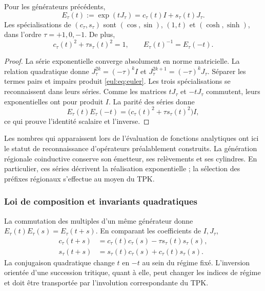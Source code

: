 \begin{teorema}
\label{eul:teo:euler}
Pour les générateurs précédents,
\begin{equation}
 E_\tau(t):=\exp(tJ_\tau)
 =c_\tau(t)I+s_\tau(t)J_\tau.
\label{eul:eq:euler}
\end{equation}
Les spécialisations de \((c_\tau,s_\tau)\) sont
\((\cos,\sin)\), \((1,t)\) et \((\cosh,\sinh)\), dans l’ordre
\(\tau=+1,0,-1\). De plus,
\[
 c_\tau(t)^2+\tau s_\tau(t)^2=1,
 \qquad E_\tau(t)^{-1}=E_\tau(-t).
\]
\end{teorema}
\begin{proof}
La série exponentielle converge absolument en norme matricielle.
La relation quadratique donne
\(J_\tau^{2k}=(-\tau)^kI\) et
\(J_\tau^{2k+1}=(-\tau)^kJ_\tau\). Séparer les termes pairs et
impairs produit \eqref{eul:eq:euler}. Les trois spécialisations se
reconnaissent dans leurs séries. Comme les matrices \(tJ_\tau\) et \(-tJ_\tau\)
commutent, leurs exponentielles ont pour produit \(I\). La parité des
séries donne
\[
 E_\tau(t)E_\tau(-t)
 =\bigl(c_\tau(t)^2+\tau s_\tau(t)^2\bigr)I,
\]
ce qui prouve l’identité scalaire et l’inverse.
\end{proof}

Les nombres qui apparaissent lors de l’évaluation de fonctions analytiques ont ici
le statut de reconnaissance d’opérateurs préalablement construits.
La génération régionale coinductive conserve son émetteur, ses relèvements
et ses cylindres. En particulier, ces séries décrivent la réalisation
exponentielle ; la sélection des préfixes régionaux s’effectue au moyen
du TPK.

\subsubsection{Loi de composition et invariants quadratiques}

La commutation des multiples d’un même générateur donne
\(E_\tau(t)E_\tau(s)=E_\tau(t+s)\). En comparant les coefficients de
\(I,J_\tau\),
\begin{align}
 c_\tau(t+s)&=c_\tau(t)c_\tau(s)-\tau s_\tau(t)s_\tau(s),\\
 s_\tau(t+s)&=s_\tau(t)c_\tau(s)+c_\tau(t)s_\tau(s).
\end{align}
La conjugaison quadratique change \(t\) en \(-t\) au sein du régime
fixé. L’inversion orientée d’une succession tritique, quant à elle,
peut changer les indices de régime et doit être transportée par
l’involution correspondante du TPK.


